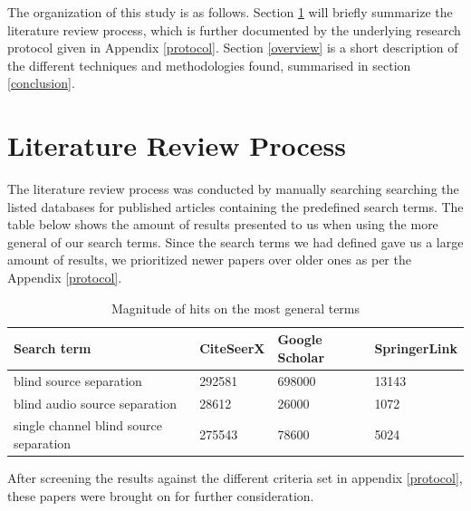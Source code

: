 The organization of this study is as follows. Section
\ref{reviewProcess} will briefly summarize the literature review
process, which is further documented by the underlying research
protocol given in Appendix \ref{protocol}. Section \ref{overview} is
a short description of the different techniques and methodologies found, summarised in section \ref{conclusion}.

\clearpage

\section{Literature Review Process}\label{reviewProcess} %
The literature review process was conducted by manually searching searching the listed databases for published articles containing the predefined search terms.
The table below shows the amount of results presented to us when  using the more general of our search terms. Since the search terms we had defined gave us a large amount of results, we prioritized newer papers over older ones as per the Appendix \ref{protocol}.

\begin{table}[h]
\centering
	\begin{tabular}{|l|l|l|l|}
	\hline
	\textbf{Search term} & \textbf{CiteSeerX} & \textbf{Google Scholar} & \textbf{SpringerLink} \\
	\hline
	blind source separation & 292581 & 698000 & 13143\\
	blind audio source separation & 28612 & 26000 & 1072\\
	single channel blind source separation & 275543 & 78600 & 5024\\
	\hline
	\end{tabular}
\caption{Magnitude of hits on the most general terms}
\label{tab:myfirsttable}
\end{table}

After screening the results against the different criteria set in appendix \ref{protocol}, these papers were brought on for further consideration.

